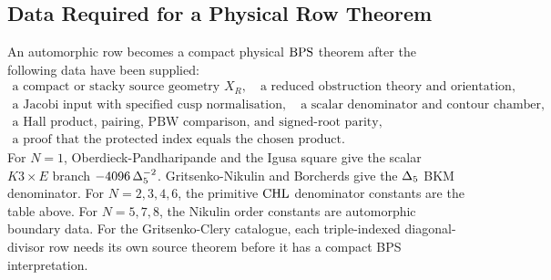 \subsection*{Data Required for a Physical Row Theorem}

An automorphic row becomes a compact physical \(\mathrm{BPS}\) theorem after
the following data have been supplied:
\[
\begin{gathered}
  \text{a compact or stacky source geometry }X_R,\quad
  \text{a reduced obstruction theory and orientation},\\
  \text{a Jacobi input with specified cusp normalisation},\quad
  \text{a scalar denominator and contour chamber},\\
  \text{a Hall product, pairing, PBW comparison, and signed-root parity},\\
  \text{a proof that the protected index equals the chosen product.}
\end{gathered}
\]
For \(N=1\), Oberdieck-Pandharipande and the Igusa square give the
scalar \(K3\times E\) branch
\(-4096\,\Delta_5^{-2}\).  Gritsenko-Nikulin and Borcherds give
the \(\Delta_5\) BKM denominator.  For \(N=2,3,4,6\), the primitive
\(\mathrm{CHL}\) denominator constants are the table above.  For \(N=5,7,8\),
the Nikulin order constants are automorphic boundary data.  For the
Gritsenko-Clery catalogue, each triple-indexed diagonal-divisor row
needs its own source theorem before it has a compact BPS interpretation.
